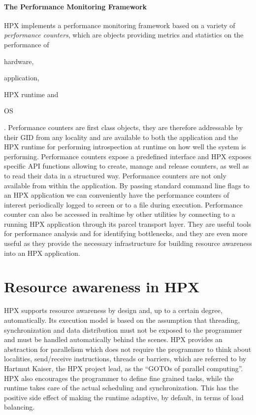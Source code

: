 \paragraph{The Performance Monitoring Framework}
HPX implements a performance monitoring framework based on a variety of \emph{performance counters}, which are objects providing metrics and statistics on the performance of
\begin{enumerate*}[label={(\roman*)}]
	\item hardware,
	\item application,
	\item HPX runtime and
	\item OS
\end{enumerate*}.
Performance counters are first class objects, they are therefore addressable by their GID from any locality and are available to both the application and the HPX runtime for performing introspection at runtime on how well the system is performing.\cite{kaiser2014hpx}
Performance counters expose a predefined interface and HPX exposes specific API functions allowing to create, manage and release counters, as well as to read their data in a structured way.
Performance counters are not only available from within the application. By passing standard command line flags to an HPX application we can conveniently have the performance counters of interest periodically logged to screen or to a file during execution. Performance counter can also be accessed in realtime by other utilities by connecting to a running HPX application through its parcel transport layer\cite{kaiser2014hpx}.
They are useful tools for performance analysis and for identifying bottlenecks, and they are even more useful as they provide the necessary infrastructure for building resource awareness into an HPX application\cite{grubel2016using}.


\section{Resource awareness in HPX} \label{sec:hpxRAC}
HPX supports resource awareness by design and, up to a certain degree, automatically.
Its execution model is based on the assumption that threading, synchronization and data distribution must not be exposed to the programmer and must be handled automatically behind the scenes. HPX provides an abstraction for parallelism which does not require the programmer to think about localities, send/receive instructions, threads or barriers, which are referred to by Hartmut Kaiser, the HPX project lead, as the ``GOTOs of parallel computing''\cite{kaiser2014goto}. HPX also encourages the programmer to define fine grained tasks, while the runtime takes care of the actual scheduling and synchronization. This has the positive side effect of making the runtime adaptive, by default, in terms of load balancing.

